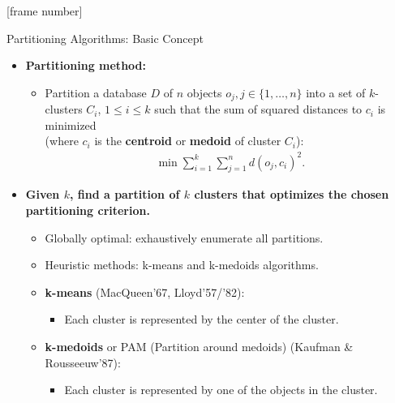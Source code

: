 \documentclass[aspectratio=169,t,xcolor=dvipsnames]{beamer}
\begin{document}
  {
    [frame number]
    \begin{frame}{Partitioning Algorithms: Basic Concept}
        \begin{itemize}
          \item \textbf{Partitioning method:}
          \begin{itemize}
            \item Partition a database $D$ of $n$ objects $o_j, j \in \{1, \ldots, n\}$ into a set of $k$-clusters $C_i$, $1 \leq i \leq k$ such that the sum of squared distances to $c_i$ is minimized \\ (where $c_i$ is the \textbf{\color{airforceblue}centroid} or \textbf{\color{airforceblue}medoid} of cluster $C_i$):
            \begin{align}
              \min \sum_{i=1}^{k} \sum_{j=1}^{n} d(o_j,c_i)^2.
            \end{align}
          \end{itemize}
          \item \textbf{Given $k$, find a partition of $k$ clusters that optimizes the chosen partitioning criterion.}
          \begin{itemize}
            \item Globally optimal: exhaustively enumerate all partitions.
            \item Heuristic methods: k-means and k-medoids algorithms.
            \item \textbf{\color{airforceblue}k-means} (MacQueen'67, Lloyd'57/'82):
            \begin{itemize}
              \item Each cluster is represented by the center of the cluster.
            \end{itemize}
            \item \textbf{\color{airforceblue}k-medoids} or PAM (Partition around medoids) (Kaufman \& Rousseeuw'87):
            \begin{itemize}
              \item Each cluster is represented by one of the objects in the cluster.
            \end{itemize}
          \end{itemize}
        \end{itemize}
    \end{frame}
  }
\end{document}
